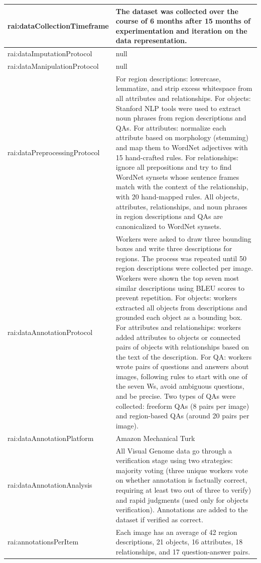 \documentclass[10pt,a4paper]{article}
\begin{document}
\begin{longtable}{|p{4cm}|p{12cm}|}
\hline
rai:dataCollectionTimeframe & The dataset was collected over the course of 6 months after 15 months of experimentation and iteration on the data representation. \\
\hline
rai:dataImputationProtocol & null \\
\hline
rai:dataManipulationProtocol & null \\
\hline
rai:dataPreprocessingProtocol & For region descriptions: lowercase, lemmatize, and strip excess whitespace from all attributes and relationships. For objects: Stanford NLP tools were used to extract noun phrases from region descriptions and QAs. For attributes: normalize each attribute based on morphology (stemming) and map them to WordNet adjectives with 15 hand-crafted rules. For relationships: ignore all prepositions and try to find WordNet synsets whose sentence frames match with the context of the relationship, with 20 hand-mapped rules. All objects, attributes, relationships, and noun phrases in region descriptions and QAs are canonicalized to WordNet synsets. \\
\hline
rai:dataAnnotationProtocol & Workers were asked to draw three bounding boxes and write three descriptions for regions. The process was repeated until 50 region descriptions were collected per image. Workers were shown the top seven most similar descriptions using BLEU scores to prevent repetition. For objects: workers extracted all objects from descriptions and grounded each object as a bounding box. For attributes and relationships: workers added attributes to objects or connected pairs of objects with relationships based on the text of the description. For QA: workers wrote pairs of questions and answers about images, following rules to start with one of the seven Ws, avoid ambiguous questions, and be precise. Two types of QAs were collected: freeform QAs (8 pairs per image) and region-based QAs (around 20 pairs per image). \\
\hline
rai:dataAnnotationPlatform & Amazon Mechanical Turk \\
\hline
rai:dataAnnotationAnalysis & All Visual Genome data go through a verification stage using two strategies: majority voting (three unique workers vote on whether annotation is factually correct, requiring at least two out of three to verify) and rapid judgments (used only for objects verification). Annotations are added to the dataset if verified as correct. \\
\hline
rai:annotationsPerItem & Each image has an average of 42 region descriptions, 21 objects, 16 attributes, 18 relationships, and 17 question-answer pairs. \\

\end{longtable}
\end{document}
